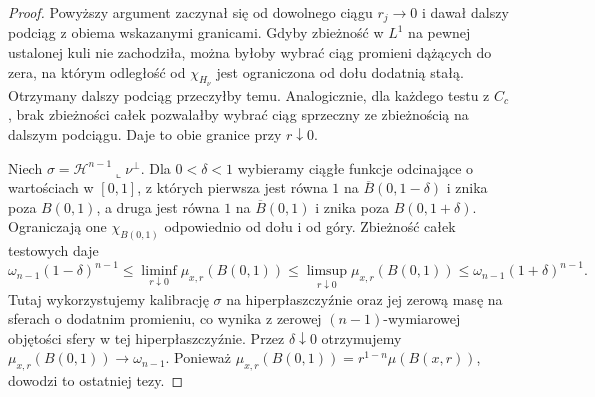 \begin{proof}
Powyższy argument zaczynał się od dowolnego ciągu
$r_j\to0$ i dawał dalszy podciąg z obiema
wskazanymi granicami. Gdyby zbieżność w $L^1$
na pewnej ustalonej kuli nie zachodziła, można
byłoby wybrać ciąg promieni dążących do zera,
na którym odległość od $\chi_{H_\nu}$ jest
ograniczona od dołu dodatnią stałą. Otrzymany
dalszy podciąg przeczyłby temu. Analogicznie,
dla każdego testu z $C_c$, brak zbieżności
całek pozwalałby wybrać ciąg sprzeczny ze
zbieżnością na dalszym podciągu.
Daje to obie granice przy $r\downarrow0$.

Niech $\sigma=\mathcal H^{n-1}\llcorner\nu^\perp$.
Dla $0<\delta<1$ wybieramy ciągłe funkcje
odcinające o wartościach w $[0,1]$,
z których pierwsza jest równa $1$ na
$\overline B(0,1-\delta)$ i znika poza $B(0,1)$,
a druga jest równa $1$ na $\overline B(0,1)$
i znika poza $B(0,1+\delta)$.
Ograniczają one $\chi_{B(0,1)}$ odpowiednio
od dołu i od góry. Zbieżność całek testowych daje
\[
 \omega_{n-1}(1-\delta)^{n-1}
 \le\liminf_{r\downarrow0}\mu_{x,r}(B(0,1))
 \le\limsup_{r\downarrow0}\mu_{x,r}(B(0,1))
 \le\omega_{n-1}(1+\delta)^{n-1}.
\]
Tutaj wykorzystujemy kalibrację $\sigma$ na
hiperpłaszczyźnie oraz jej zerową masę na sferach
o dodatnim promieniu, co wynika z zerowej
$(n-1)$-wymiarowej objętości sfery w tej
hiperpłaszczyźnie. Przez $\delta\downarrow0$
otrzymujemy $\mu_{x,r}(B(0,1))\to\omega_{n-1}$.
Ponieważ $\mu_{x,r}(B(0,1))=r^{1-n}\mu(B(x,r))$,
dowodzi to ostatniej tezy.
\end{proof}

